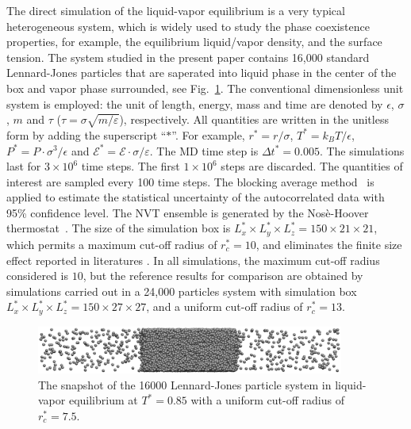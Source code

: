\documentclass[aps,pre,preprint]{revtex4}
\begin{document}
The direct simulation of the liquid-vapor equilibrium is a very
typical heterogeneous system, which is widely used to study the phase
coexistence properties, for example, the equilibrium liquid/vapor
density, and the surface tension. The system studied in the present
paper contains 16,000 standard Lennard-Jones particles that are
saperated into liquid phase in the center of the box and vapor phase
surrounded, see Fig.~\ref{fig:tmp1}.  The conventional dimensionless
unit system is employed: the unit of length, energy, mass and time are
denoted by $\epsilon$, $\sigma$, $m$ and $\tau$ ($\tau =
\sigma\sqrt{m/\varepsilon}$), respectively.  All quantities are
written in the unitless form by adding the superscript ``$\ast$''.
For example, $r^\ast = r / \sigma$, $T^\ast = k_BT / \epsilon$,
$P^\ast = P\cdot \sigma^3 / \epsilon$ and $\mathcal E^\ast = \mathcal
E\cdot\sigma/\varepsilon$.  The MD time step {is} $\Delta t^\ast =
0.005$. The simulations last for $3\times 10^6$ time steps. The first
$1\times 10^6$ steps are discarded. The quantities of interest are
sampled every 100 time steps. The blocking average
method~\cite{flyvbjerg1989error} is applied to estimate the
statistical uncertainty of the autocorrelated data with 95\%
confidence level. The NVT ensemble is generated by the Nos\`e-Hoover
thermostat~\cite{nose1984molecular, hoover1985canonical}.  The size of
the simulation box is $L_x^\ast \times L_y^\ast \times L_z^\ast =
150\times 21\times 21$, which permits a maximum cut-off radius of
$r_c^\ast = 10$, and eliminates the finite size effect reported in
literatures \cite{chen1995area, orea2005oscillatory,
  biscay2009calculation}. In all simulations, the maximum cut-off
radius considered is $10$, but the reference results for comparison
are obtained by simulations carried out in a 24,000 particles system
with simulation box $L_x^\ast \times L_y^\ast \times L_z^\ast =
150\times 27\times 27$, and a uniform cut-off radius of $r_c^\ast =
13$.

\begin{figure}
  \centering
  \includegraphics[width=0.9\textwidth]{fig/t0.85-n16000-rc07.5uni/confout.eps}
  \caption{The snapshot of the 16000 Lennard-Jones particle system in
    liquid-vapor equilibrium at $T^\ast=0.85$ with a uniform cut-off
    radius of $r_c^\ast = 7.5$.}
  \label{fig:tmp1}
\end{figure}
\end{document}
